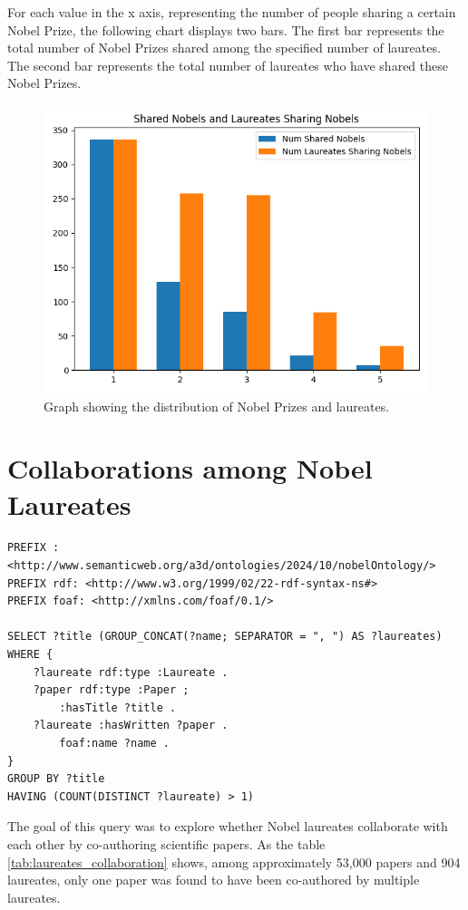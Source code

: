 \documentclass{article}
\begin{document}
\noindent For each value in the x axis, representing the number of people sharing a certain Nobel Prize, the following chart displays two bars.
The first bar represents the total number of Nobel Prizes shared among the specified number of laureates.
The second bar represents the total number of laureates who have shared these Nobel Prizes.
\begin{figure}[H]
	\centering
	\includegraphics[width=0.7\linewidth]{../queries/plots/prizeShare.png}
	\caption{Graph showing the distribution of Nobel Prizes and laureates.}
	\label{fig:prizeShare}
\end{figure}

\section{Collaborations among Nobel Laureates}

\begin{lstlisting}
PREFIX : <http://www.semanticweb.org/a3d/ontologies/2024/10/nobelOntology/>
PREFIX rdf: <http://www.w3.org/1999/02/22-rdf-syntax-ns#>
PREFIX foaf: <http://xmlns.com/foaf/0.1/>

SELECT ?title (GROUP_CONCAT(?name; SEPARATOR = ", ") AS ?laureates) WHERE {
    ?laureate rdf:type :Laureate .
    ?paper rdf:type :Paper ;
        :hasTitle ?title .
    ?laureate :hasWritten ?paper .
        foaf:name ?name .
}
GROUP BY ?title
HAVING (COUNT(DISTINCT ?laureate) > 1)
\end{lstlisting}

\vspace{1em}

The goal of this query was to explore whether Nobel laureates collaborate with each other by co-authoring
scientific papers. As the table \ref{tab:laureates_collaboration} shows, among approximately 53,000 papers
and 904 laureates, only one paper was found to have been co-authored by multiple laureates.
\end{document}
